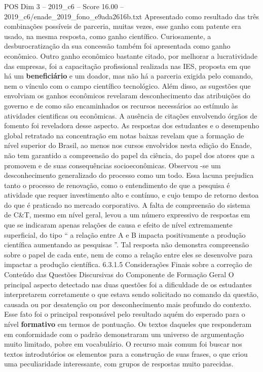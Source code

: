 \begin{textsample}{POS Dim 3 – 2019\_c6 – Score 16.00 – 2019\_c6/enade\_2019\_fono\_e9ada2616b.txt}
Apresentado como resultado das três combinações possíveis de parceria, muitas vezes, esse ganho com patente era usado, na mesma resposta, como ganho científico.
Curiosamente, a desburocratização da sua concessão também foi apresentada como ganho econômico.
Outro ganho econômico bastante citado, por melhorar a lucratividade das empresas, foi a capacitação profissional realizada nas IES, proposta em que há um \textbf{beneficiário} e um doador, mas não há a parceria exigida pelo comando, nem o vínculo com o campo científico tecnológico.
Além disso, as sugestões que envolviam os ganhos econômicos revelaram desconhecimento das atribuições do governo e de como são encaminhados os recursos necessários ao estímulo às atividades cientificas ou econômicas.
A ausência de citações envolvendo órgãos de fomento foi reveladora desse aspecto.
As respostas dos estudantes e o desempenho global retratado na concentração em notas baixas revelam que a formação de nível superior do Brasil, ao menos nos cursos envolvidos nesta edição do Enade, não tem garantido a compreensão do papel da ciência, do papel dos atores que a promovem e de suas consequências socioeconômicas.
Observou -se um desconhecimento generalizado do processo como um todo.
Essa lacuna prejudica tanto o processo de renovação, como o entendimento de que a pesquisa é atividade que requer investimento alto e contínuo, e cujo tempo de retorno destoa do que é praticado no mercado corporativo.
A falta de compreensão do sistema de C\&T, mesmo em nível geral, levou a um número expressivo de respostas em que se indicaram apenas relações de causa e efeito de nível extremamente superficial, do tipo “ a relação entre A e B impacta positivamente a produção científica aumentando as pesquisas ”.
Tal resposta não demonstra compreensão sobre o papel de cada ente, nem de como a relação entre eles se desenvolve para impactar a produção científica. 6.3.1.5 Considerações Finais sobre a correção de Conteúdo das Questões Discursivas do Componente de Formação Geral O principal aspecto detectado nas duas questões foi a dificuldade de os estudantes interpretarem corretamente o que estava sendo solicitado no comando da questão, causada ou por desatenção ou por desconhecimento mais profundo do contexto.
Esse fato foi o principal responsável pelo resultado aquém do esperado para o nível \textbf{formativo} em termos de pontuação.
Os textos daqueles que responderam em conformidade com o padrão demonstraram um universo de argumentação muito limitado, pobre em vocabulário.
O recurso mais comum foi buscar nos textos introdutórios os elementos para a construção de suas frases, o que criou uma peculiaridade interessante, com grupos de respostas muito parecidas.

\end{textsample}
